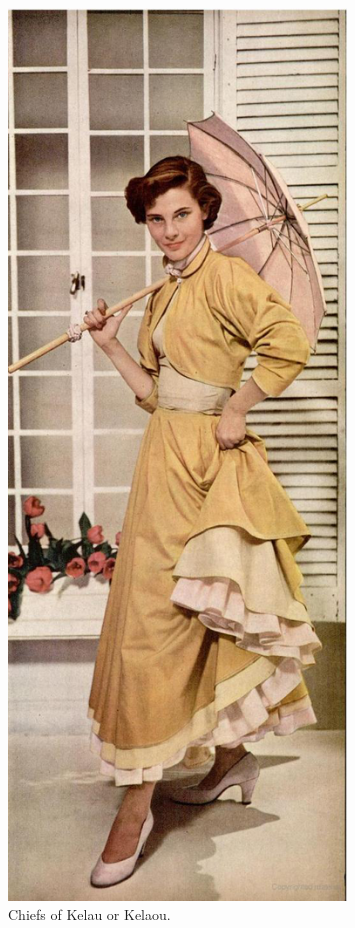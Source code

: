 \begin{figure}[p]
\centering

\includegraphics[width=0.8\textwidth,height=0.9\textheight, keepaspectratio]{./images/parasol-01.jpg}
\caption{Chiefs of Kelau or Kelaou.}
\label{fig:parasol-01}
\end{figure}

